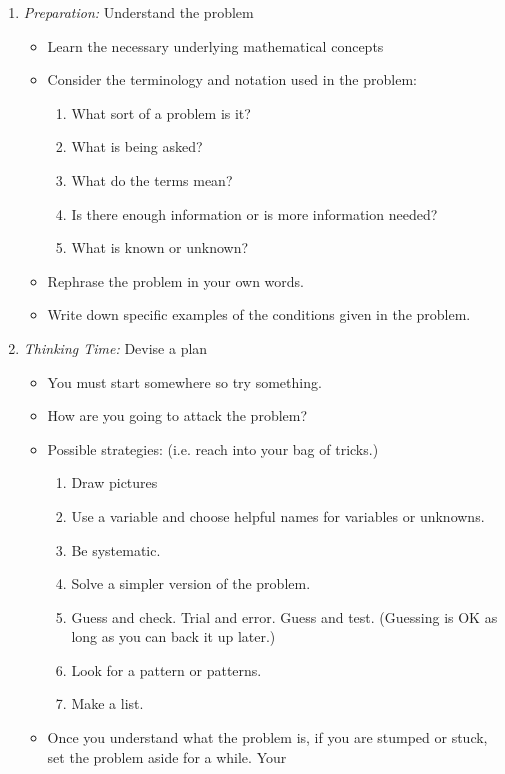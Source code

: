 \begin{enumerate}
  \item \emph{Preparation:} Understand the problem
    \begin{itemize}
      \item Learn the necessary underlying mathematical concepts
      \item Consider the terminology and notation used in the problem:
        \begin{enumerate}
          \item What sort of a problem is it?
          \item What is being asked?
          \item What do the terms mean?
          \item Is there enough information or is more information needed?
          \item What is known or unknown?
        \end{enumerate}
      \item Rephrase the problem in your own words.
      \item Write down specific examples of the conditions given in the problem.
    \end{itemize}
  \item \emph{Thinking Time:} Devise a plan
    \begin{itemize}
      \item You must start somewhere so try something.
      \item How are you going to attack the problem?
      \item Possible strategies: (i.e. reach into your bag of tricks.)
        \begin{enumerate}
          \item Draw pictures
          \item Use a variable and choose helpful names for variables or unknowns.
          \item Be systematic.
          \item Solve a simpler version of the problem.
          \item Guess and check.  Trial and error.  Guess and test. (Guessing is OK as long as you can back it up later.)
          \item Look for a pattern or patterns.
          \item Make a list.
        \end{enumerate}
      \item Once you understand what the problem is, if you are stumped or stuck, set the problem aside for a while. Your

\end{itemize}
\end{enumerate}
